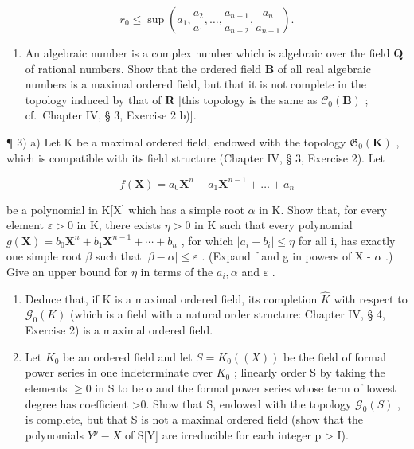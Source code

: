\[
r _ {0} \leqslant \sup \left(a _ {1}, \frac {a _ {2}}{a _ {1}}, \dots , \frac {a _ {n - 1}}{a _ {n - 2}}, \frac {a _ {n}}{a _ {n - 1}}\right).
\]

\begin{enumerate}
\def\labelenumi{\arabic{enumi})}
\setcounter{enumi}{1}
\tightlist
\item
  An algebraic number is a complex number which is algebraic over the field \(\mathbf{Q}\) of rational numbers. Show that the ordered field \(\mathbf{B}\) of all real algebraic numbers is a maximal ordered field, but that it is not complete in the topology induced by that of \(\mathbf{R}\) {[}this topology is the same as \(\mathcal{C}_0(\mathbf{B})\) ; cf.~Chapter IV, § 3, Exercise 2 b){]}.
\end{enumerate}

¶ 3) a) Let K be a maximal ordered field, endowed with the topology \(\mathfrak{G}_{0}(\mathbf{K})\) , which is compatible with its field structure (Chapter IV, § 3, Exercise 2). Let

\[
f (\mathbf {X}) = a _ {0} \mathbf {X} ^ {n} + a _ {1} \mathbf {X} ^ {n - 1} + \dots + a _ {n}
\]

be a polynomial in K{[}X{]} which has a simple root \(\alpha\) in K. Show that, for every element \(\varepsilon > 0\) in K, there exists \(\eta > 0\) in K such that every polynomial \(g(\mathbf{X}) = b_{0}\mathbf{X}^{n} + b_{1}\mathbf{X}^{n-1} + \cdots + b_{n}\) , for which \(|a_{i} - b_{i}| \leqslant \eta\) for all i, has exactly one simple root \(\beta\) such that \(|\beta - \alpha| \leqslant \varepsilon\) . (Expand f and g in powers of X - \(\alpha\) .) Give an upper bound for \(\eta\) in terms of the \(a_{i}, \alpha\) and \(\varepsilon\) .

\begin{enumerate}
\def\labelenumi{\alph{enumi})}
\setcounter{enumi}{1}
\item
  Deduce that, if K is a maximal ordered field, its completion \(\hat{K}\) with respect to \(\mathcal{G}_{0}(K)\) (which is a field with a natural order structure: Chapter IV, § 4, Exercise 2) is a maximal ordered field.
\item
  Let \(K_{0}\) be an ordered field and let \(S = K_{0}((X))\) be the field of formal power series in one indeterminate over \(K_{0}\) ; linearly order S by taking the elements \(\geqslant 0\) in S to be o and the formal power series whose term of lowest degree has coefficient \textgreater0. Show that S, endowed with the topology \(\mathcal{G}_{0}(S)\) , is complete, but that S is not a maximal ordered field (show that the polynomials \(Y^{p} - X\) of S{[}Y{]} are irreducible for each integer p \textgreater{} I).
\end{enumerate}

